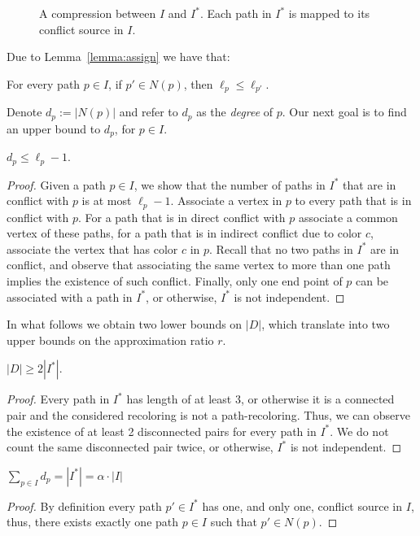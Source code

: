 \begin{figure}
\centering

\caption{
\label{fig:greedy-vs-opt}
A compression between $I$ and $I^*$.
Each path in $I^*$ is mapped to its conflict source in $I$.
}
\end{figure}

Due to Lemma~\ref{lemma:assign} we have that:

\begin{observation}
\label{co:dpLeqDp'}
For every path $p \in I$, if $p' \in N(p)$, then $\ell_p \leq \ell_{p'}$.
\end{observation}

Denote $d_p := |N(p)|$ and refer to $d_p$ as the \emph{degree} of $p$.
Our next goal is to find an upper bound to $d_p$, for $p \in I$.

\begin{lemma}
\label{lm:num_in_conflict}
$d_p \leq \ell_p - 1$.
\end{lemma}
\begin{proof}
Given a path $p \in I$, we show that the number of paths in $I^*$ that
are in conflict with $p$ is at most $\ell_p - 1$.
%
Associate a vertex in $p$ to every path that is in conflict with $p$.
For a path that is in direct conflict with $p$ associate a common
vertex of these paths, for a path that is in indirect conflict due to
color $c$, associate the vertex that has color $c$ in $p$.  Recall
that no two paths in $I^*$ are in conflict, and observe that
associating the same vertex to more than one path implies the
existence of such conflict. 
Finally, only one end point of $p$ can be associated with a path in $I^*$, 
or otherwise, $I^*$ is not independent.
{}\end{proof}

In what follows we obtain two lower bounds on $|D|$, which translate
into two upper bounds on the approximation ratio $r$.

\begin{lemma}
\label{lemma:kernel}
$|D| \geq 2|I^*|$.
\end{lemma}
\begin{proof}
Every path in $I^*$ has length of at least 3, or otherwise it is a
connected pair and the considered recoloring is not a path-recoloring.
Thus, we can observe the existence of at least 2 disconnected pairs
for every path in $I^*$.  We do not count the same disconnected pair
twice, or otherwise, $I^*$ is not independent.
{}\end{proof}


\begin{observation}
\label{obs:sum}
$\sum_{p \in I}{d_p} = |I^*| = \alpha \cdot |I|$
\end{observation}
\begin{proof}
By definition every path $p' \in I^*$ has one, and only one, conflict
source in $I$, thus, 
there exists exactly one path $p \in I$ such that $p' \in N(p)$.
{}\end{proof}


